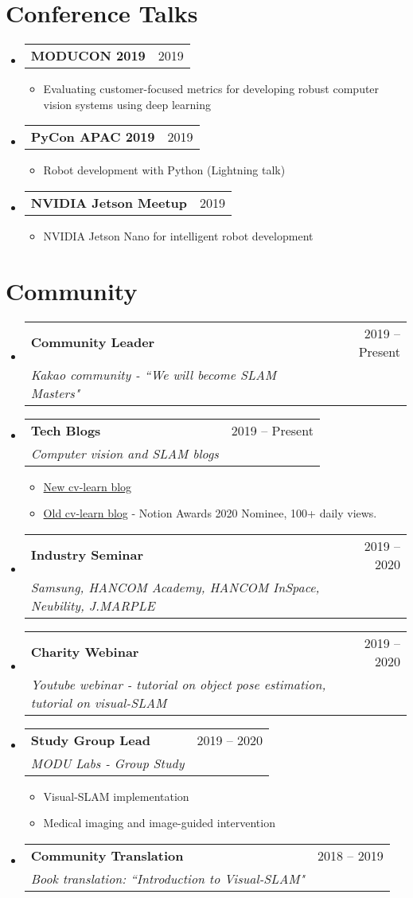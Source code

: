\documentclass[letterpaper,11pt]{article}
\makeatletter
\newcommand{\resumeItem}[1]{
  \item\small{
    {#1 \vspace{-2pt}}
  }
}
\newcommand{\resumeSubheading}[4]{
  \vspace{-1pt}\item
    \begin{tabular*}{0.97\textwidth}[t]{l@{\extracolsep{\fill}}r}
      \textbf{#1} & #2 \\
      \textit{\small#3} & \textit{\small #4} \\
    \end{tabular*}\vspace{-5pt}
}
\newcommand{\resumeTalk}[2]{
  \vspace{-1pt}\item
    \begin{tabular*}{0.97\textwidth}[t]{l@{\extracolsep{\fill}}r}
      \textbf{#1} & #2 \\
    \end{tabular*}\vspace{-5pt}
}
\newcommand{\resumeSubHeadingListStart}{\begin{itemize}[leftmargin=*]}
\newcommand{\resumeSubHeadingListEnd}{\end{itemize}}
\newcommand{\resumeItemListStart}{\begin{itemize}}
\newcommand{\resumeItemListEnd}{\end{itemize}\vspace{-5pt}}
\makeatother
\begin{document}
\section{Conference Talks}
    \resumeSubHeadingListStart
    
        \resumeTalk{MODUCON 2019}{2019}
            \resumeItemListStart
                \resumeItem{Evaluating customer-focused metrics for developing robust computer vision systems using deep learning}
            \resumeItemListEnd

        \resumeTalk{PyCon APAC 2019}{2019}
            \resumeItemListStart
                \resumeItem{Robot development with Python (Lightning talk)}
            \resumeItemListEnd

        \resumeTalk{NVIDIA Jetson Meetup}{2019}
            \resumeItemListStart
                \resumeItem{NVIDIA Jetson Nano for intelligent robot development}
            \resumeItemListEnd
    \resumeSubHeadingListEnd

\section{Community}
    \resumeSubHeadingListStart
        \resumeSubheading{Community Leader}{2019 -- Present}
        {Kakao community - ``We will become SLAM Masters"}{}
    
        \resumeSubheading{Tech Blogs}{2019 -- Present}
            {Computer vision and SLAM blogs}{}
            \resumeItemListStart
                \resumeItem{\href{https://changh95.github.io}{\color{blue} New cv-learn blog}}
                \resumeItem{\href{http://cv-learn.com}{\color{blue} Old cv-learn blog} - Notion Awards 2020 Nominee, 100+ daily views.}
           \resumeItemListEnd   
           
        \resumeSubheading{Industry Seminar}{2019 -- 2020}
        {Samsung, HANCOM Academy, HANCOM InSpace, Neubility, J.MARPLE}{}
    
        \resumeSubheading{Charity Webinar}{2019 -- 2020}
        {Youtube webinar - tutorial on object pose estimation, tutorial on visual-SLAM}{}
    
        \resumeSubheading{Study Group Lead}{2019 -- 2020}
            {MODU Labs - Group Study}{}
            \resumeItemListStart
                \resumeItem{Visual-SLAM implementation}
                \resumeItem{Medical imaging and image-guided intervention}
            \resumeItemListEnd   
            
        \resumeSubheading{Community Translation}{2018 -- 2019}
        {Book translation: ``Introduction to Visual-SLAM"}{}
        
    \resumeSubHeadingListEnd

\end{document}
